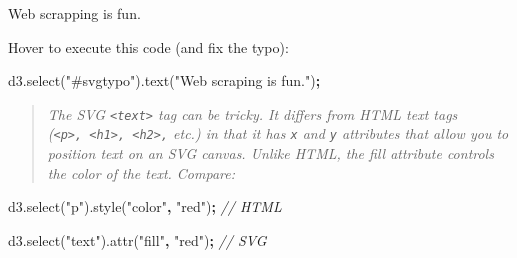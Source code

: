 \documentclass[openany]{book}
\newenvironment{Shaded}{\begin{snugshade}}{\end{snugshade}}
\newcommand{\AttributeTok}[1]{\textcolor[rgb]{0.77,0.63,0.00}{#1}}
\newcommand{\CommentTok}[1]{\textcolor[rgb]{0.56,0.35,0.01}{\textit{#1}}}
\newcommand{\KeywordTok}[1]{\textcolor[rgb]{0.13,0.29,0.53}{\textbf{#1}}}
\newcommand{\NormalTok}[1]{#1}
\newcommand{\OperatorTok}[1]{\textcolor[rgb]{0.81,0.36,0.00}{\textbf{#1}}}
\newcommand{\OtherTok}[1]{\textcolor[rgb]{0.56,0.35,0.01}{#1}}
\newcommand{\StringTok}[1]{\textcolor[rgb]{0.31,0.60,0.02}{#1}}
\newcommand{\VariableTok}[1]{\textcolor[rgb]{0.00,0.00,0.00}{#1}}
\begin{document}
\begin{Shaded}
\end{Shaded}

Web scrapping is fun.

Hover to execute this code (and fix the typo):

\hypertarget{fixsvgtypo}{}
\begin{Shaded}
\begin{Highlighting}[]
\VariableTok{d3}\NormalTok{.}\AttributeTok{select}\NormalTok{(}\StringTok{"#svgtypo"}\NormalTok{).}\AttributeTok{text}\NormalTok{(}\StringTok{"Web scraping is fun."}\NormalTok{)}\OperatorTok{;}
\end{Highlighting}
\end{Shaded}

\begin{quote}
 \emph{The SVG \texttt{\textless{}text\textgreater{}} tag can be tricky. It differs from HTML text tags (\texttt{\textless{}p\textgreater{},\ \textless{}h1\textgreater{},\ \textless{}h2\textgreater{},} etc.) in that it has \texttt{x} and \texttt{y} attributes that allow you to position text on an SVG canvas. Unlike HTML, the fill attribute controls the color of the text. Compare:}
\end{quote}

\begin{Shaded}
\begin{Highlighting}[]
\VariableTok{d3}\NormalTok{.}\AttributeTok{select}\NormalTok{(}\StringTok{"p"}\NormalTok{).}\AttributeTok{style}\NormalTok{(}\StringTok{"color"}\OperatorTok{,} \StringTok{"red"}\NormalTok{)}\OperatorTok{;}   \CommentTok{// HTML}

\VariableTok{d3}\NormalTok{.}\AttributeTok{select}\NormalTok{(}\StringTok{"text"}\NormalTok{).}\AttributeTok{attr}\NormalTok{(}\StringTok{"fill"}\OperatorTok{,} \StringTok{"red"}\NormalTok{)}\OperatorTok{;}  \CommentTok{// SVG}
\end{Highlighting}
\end{Shaded}
\end{document}

